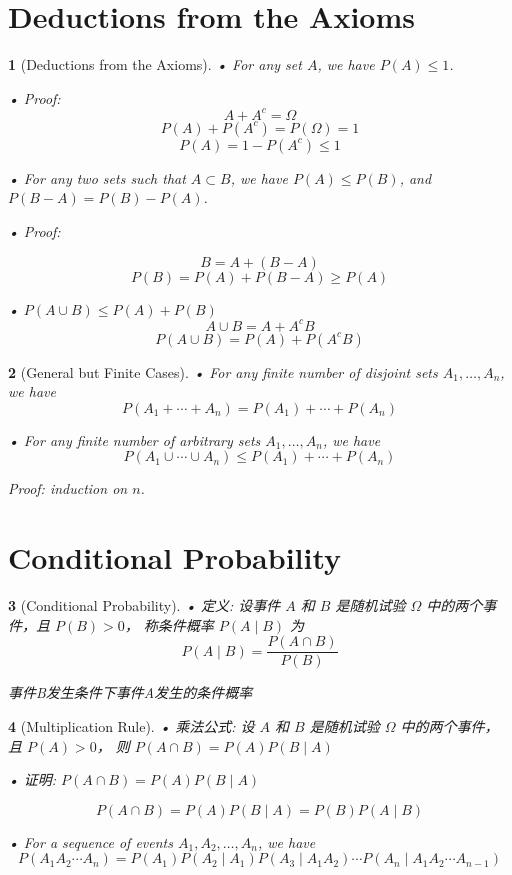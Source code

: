 \documentclass[UTF8]{report}
\theoremstyle{MyLineTheoremStyle} %
\theoremstyle{MyBlockTheoremStyle} %
\theoremstyle{MySubsubsectionStyle} %
\newtheorem{definition}{}
\begin{document}
\section{Deductions from the Axioms}
\begin{definition}[Deductions from the Axioms]
    • For any set \(A\), we have \(P(A) \leq 1\).\par
    • Proof:
    \[
    A + A^c = \Omega
    \]
    \[
    P(A) + P(A^c) = P(\Omega) = 1
    \]
    \[
    P(A) = 1 - P(A^c) \leq 1
    \]\par
    • For any two sets such that \(A \subset B\), we have \(P(A) \leq P(B)\), and \(P(B - A) = P(B) - P(A)\).\par
    • Proof:\par
    \[
    B = A + (B - A)
    \]
    \[
    P(B) = P(A) + P(B - A) \geq P(A)
    \]\par
    • \(P(A \cup B) \leq P(A) + P(B)\)
    \[
    A \cup B = A + A^c B
    \]
    \[
    P(A \cup B) = P(A) + P(A^c B)
    \]
\end{definition}

\begin{definition}[General but Finite Cases]
    • For any finite number of disjoint sets \(A_1, \ldots, A_n\), we have
    \[
    P(A_1 + \cdots + A_n) = P(A_1) + \cdots + P(A_n)
    \]\par
    • For any finite number of arbitrary sets \(A_1, \ldots, A_n\), we have
    \[
    P(A_1 \cup \cdots \cup A_n) \leq P(A_1) + \cdots + P(A_n)
    \]\par
    Proof: induction on \(n\).\par
\end{definition}

\section{Conditional Probability}
\begin{definition}[Conditional Probability]
    • 定义: 设事件 \(A\) 和 \(B\) 是随机试验 \(\Omega\) 中的两个事件，且 \(P(B) > 0\)，
    称条件概率 \(P(A \mid B)\) 为
    \[
    P(A \mid B) = \frac{P(A \cap B)}{P(B)}
    \]\par
    事件B发生条件下事件A发生的条件概率
\end{definition}

\begin{definition}[Multiplication Rule]
    • 乘法公式: 设 \(A\) 和 \(B\) 是随机试验 \(\Omega\) 中的两个事件，且 \(P(A) > 0\)，
    则 \(P(A \cap B) = P(A)P(B \mid A)\)\par
    • 证明: \(P(A \cap B) = P(A)P(B \mid A)\) \par
    \[
    P(A \cap B) = P(A)P(B \mid A) = P(B)P(A \mid B)
    \]\par
    • For a sequence of events \(A_1, A_2, \ldots, A_n\), we have
    \[
    P(A_1 A_2 \cdots A_n) = P(A_1) P(A_2 \mid A_1) P(A_3 \mid A_1 A_2) \cdots P(A_n \mid A_1 A_2 \cdots A_{n-1})
    \]
\end{definition}
\end{document}
